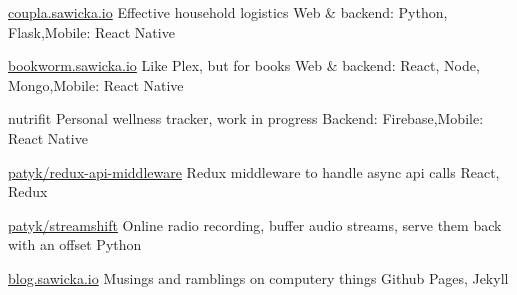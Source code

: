 
\begin{cvprojects}

	\cvproject
		{\href{http://coupla.sawicka.io}{coupla.sawicka.io}}
		{Effective household logistics}
		{Web \& backend: Python, Flask,\newline Mobile: React Native}

	\cvproject
		{\href{http://bookworm.sawicka.io}{bookworm.sawicka.io}}
		{Like Plex, but for books}
		{Web \& backend: React, Node, Mongo,\newline Mobile: React Native}

	\cvproject
		{nutrifit}
		{Personal wellness tracker, work in progress}
		{Backend: Firebase,\newline Mobile: React Native}

	\cvproject
		{\faGithub\acvHeaderIconSep \href{https://github.com/patyk/redux-api-middleware}{patyk/redux-api-middleware}}
		{Redux middleware to handle async api calls}
		{React, Redux}

	\cvproject
		{\faGithub\acvHeaderIconSep \href{https://github.com/patyk/streamshift}{patyk/streamshift}}
		{Online radio recording, buffer audio streams, serve them back with an offset}
		{Python}

	\cvproject
		{\faGithub\acvHeaderIconSep \href{http://blog.sawicka.io}{blog.sawicka.io}}
		{Musings and ramblings on computery things}
		{Github Pages, Jekyll}

\end{cvprojects}
